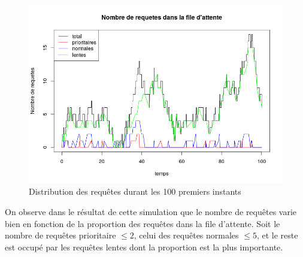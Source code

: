 \documentclass[12pt,a4paper]{article}
\begin{document}
    \begin{center}
        \begin{figure}[H]
            \includegraphics[scale=0.7]{queryDistribution.png}
            \caption{Distribution des requêtes durant les 100 premiers instants}
        \end{figure}
    \end{center}

    On observe dans le résultat de cette simulation que le nombre de requêtes varie bien en fonction de la proportion des requêtes dans la file d'attente. Soit le nombre de requêtes prioritaire $\leq 2$, celui des requêtes normales $\leq 5$, et le reste est occupé par les requêtes lentes dont la proportion est la plus importante.


    
\end{document}
